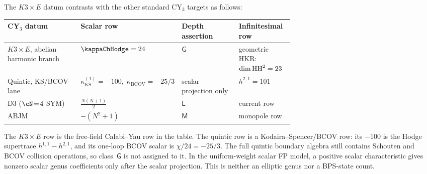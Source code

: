 \begin{remark}
\label{rem:k3e-cy3-comparison}
The $K3 \times E$ datum contrasts with the other standard CY$_3$
targets as follows:
\begin{center}
\renewcommand{\arraystretch}{1.25}
\small
\begin{tabular}{lp{0.27\linewidth}p{0.20\linewidth}p{0.19\linewidth}}
\textbf{CY$_3$ datum} & \textbf{Scalar row}
 & \textbf{Depth assertion} & \textbf{Infinitesimal row} \\
\hline
$K3 \times E$, abelian harmonic branch
& $\kappaChHodge=24$ & $\mathsf{G}$ & geometric HKR: $\dim \operatorname{HH}^2=23$ \\
Quintic, KS/BCOV lane
& $\kappa_{\mathrm{KS}}^{(1)}=-100,\;
   \kappa_{\mathrm{BCOV}}=-25/3$
& scalar projection only & $h^{2,1}=101$ \\
D3 ($\cN\!=\!4$ SYM)
& $\frac{N(N+1)}{2}$ & $\mathsf{L}$ & current row \\
ABJM & $-(N^2{+}1)$ & $\mathsf{M}$ & monopole row
\end{tabular}
\end{center}
The $K3 \times E$ row is the free-field Calabi--Yau row in the
table. The quintic row is a Kodaira--Spencer/BCOV row: its
$-100$ is the Hodge supertrace $h^{1,1}-h^{2,1}$, and its one-loop
BCOV scalar is $\chi/24=-25/3$. The full quintic boundary algebra still
contains Schouten and BCOV collision operations, so class~$\mathsf{G}$
is not assigned to it. In the uniform-weight scalar FP model, a
positive scalar characteristic gives nonzero scalar genus coefficients
only after the scalar projection. This is neither an elliptic genus nor
a BPS-state count.
\end{remark}

